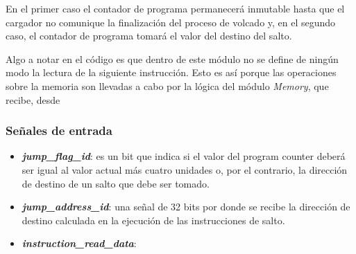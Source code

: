 En el primer caso el contador de programa permanecerá inmutable hasta que el cargador no comunique la finalización del proceso de volcado y, en el segundo caso, el contador de programa tomará el valor del destino del salto.

Algo a notar en el código es que dentro de este módulo no se define de ningún modo la lectura de la siguiente instrucción. Esto es así porque las operaciones sobre la memoria son llevadas a cabo por la lógica del módulo \textit{Memory}, que recibe, desde 

\subsubsection{Señales de entrada}

\begin{itemize}
  \item \textbf{\textit{jump\_flag\_id}}: es un bit que indica si el valor del program counter deberá ser igual al valor actual más cuatro unidades o, por el contrario, la dirección de destino de un salto que debe ser tomado.
  \vspace{-0.2cm}
  \item \textbf{\textit{jump\_address\_id}}: una señal de 32 bits por donde se recibe la dirección de destino calculada en la ejecución de las instrucciones de salto.
  \vspace{-0.2cm}
  \item \textbf{\textit{instruction\_read\_data}}:
\end{itemize}